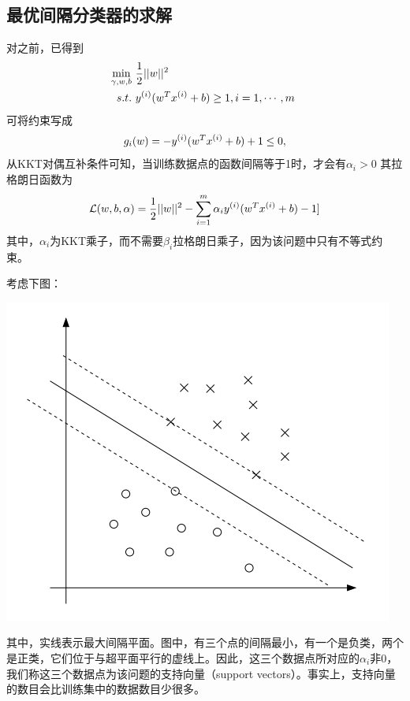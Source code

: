 \subsection{最优间隔分类器的求解}
对之前，已得到
\begin{eqnarray}
\begin{aligned}
\min_{\gamma,w,b} &\ \frac{1}{2}||w||^2\\
s.t. &\ {y}^{({i})}(w^T{x}^{({i})}+b)\geq 1,i=1,\cdots,m\
\end{aligned}
\end{eqnarray}
可将约束写成
\begin{eqnarray}
g_i(w)=-{y}^{({i})}(w^T{x}^{({i})}+b)+1\leq 0,
\end{eqnarray}
从KKT对偶互补条件可知，当训练数据点的函数间隔等于1时，才会有$\alpha_i>0$
其拉格朗日函数为
\begin{eqnarray}
\mathcal{L}(w,b,\alpha)=\frac{1}{2}||w||^2-\sum_{i=1}^m\alpha_i{y}^{({i})}(w^T{x}^{({i})}+b)-1]
\end{eqnarray}
其中，$\alpha_i$为KKT乘子，而不需要$\beta_i$拉格朗日乘子，因为该问题中只有不等式约束。

考虑下图：

\begin{center}
\includegraphics[scale=0.6]{../figures/SVM2.PNG} 
\end{center}
其中，实线表示最大间隔平面。图中，有三个点的间隔最小，有一个是负类，两个是正类，它们位于与超平面平行的虚线上。因此，这三个数据点所对应的$\alpha_i$非0，我们称这三个数据点为该问题的支持向量（support vectors）。事实上，支持向量的数目会比训练集中的数据数目少很多。

